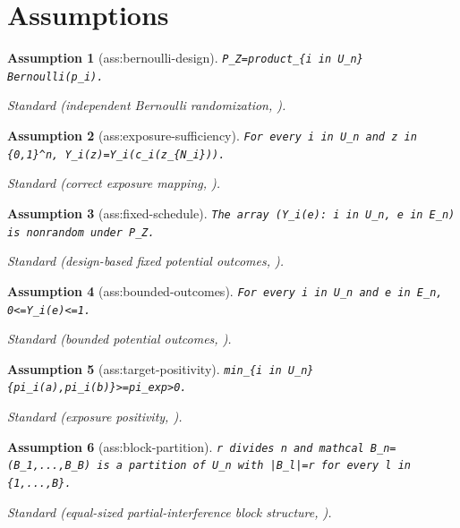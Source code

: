 \documentclass{article}
\newtheorem{assumption}{Assumption}
\begin{document}
\section{Assumptions}

\begin{assumption}[ass:bernoulli-design]\label{ass:bernoulli-design}
\texttt{P\_Z=product\_\{i in U\_n\} Bernoulli(p\_i).}
\par\smallskip\noindent\emph{Standard} (independent Bernoulli randomization, \cite{AronowSamii2017}).
\end{assumption}

\begin{assumption}[ass:exposure-sufficiency]\label{ass:exposure-sufficiency}
\texttt{For every i in U\_n and z in \{0,1\}\textasciicircum{}n, Y\_i(z)=Y\_i(c\_i(z\_\{N\_i\})).}
\par\smallskip\noindent\emph{Standard} (correct exposure mapping, \cite{AronowSamii2017}).
\end{assumption}

\begin{assumption}[ass:fixed-schedule]\label{ass:fixed-schedule}
\texttt{The array (Y\_i(e): i in U\_n, e in E\_n) is nonrandom under P\_Z.}
\par\smallskip\noindent\emph{Standard} (design-based fixed potential outcomes, \cite{AronowSamii2017}).
\end{assumption}

\begin{assumption}[ass:bounded-outcomes]\label{ass:bounded-outcomes}
\texttt{For every i in U\_n and e in E\_n, 0<=Y\_i(e)<=1.}
\par\smallskip\noindent\emph{Standard} (bounded potential outcomes, \cite{AronowSamii2017}).
\end{assumption}

\begin{assumption}[ass:target-positivity]\label{ass:target-positivity}
\texttt{min\_\{i in U\_n\}\{pi\_i(a),pi\_i(b)\}>=pi\_exp>0.}
\par\smallskip\noindent\emph{Standard} (exposure positivity, \cite{AronowSamii2017}).
\end{assumption}

\begin{assumption}[ass:block-partition]\label{ass:block-partition}
\texttt{r divides n and mathcal B\_n=(B\_1,...,B\_B) is a partition of U\_n with |B\_l|=r for every l in \{1,...,B\}.}
\par\smallskip\noindent\emph{Standard} (equal-sized partial-interference block structure, \cite{TchetgenTchetgenVanderWeele2012}).
\end{assumption}
\end{document}
